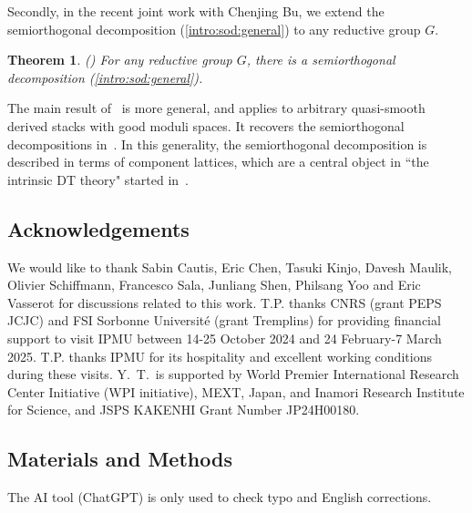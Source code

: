 \documentclass [11pt,oneside,a4paper,mathscr]{amsart}
\newtheorem{thm}{Theorem}[section]
\theoremstyle{definition}
\begin{document}
Secondly, in the recent joint work with Chenjing Bu, we extend the 
semiorthogonal decomposition (\ref{intro:sod:general})
to any reductive group $G$. 
\begin{thm}\emph{(\cite{BPT})}
For any reductive group $G$, there is a semiorthogonal decomposition (\ref{intro:sod:general}). 
\end{thm}
The main result of~\cite{BPT} is more general, and applies to arbitrary 
quasi-smooth derived stacks with good moduli spaces. It recovers the semiorthogonal decompositions in~\cite{PTK3, PThiggs}. 
In this generality, the semiorthogonal decomposition is described 
in terms of component lattices, which are a central object in ``the intrinsic DT theory" started in~\cite{bhik}. 


\subsection{Acknowledgements}
We would like to thank Sabin Cautis, Eric Chen, Tasuki Kinjo, Davesh Maulik, Olivier Schiffmann, Francesco Sala, Junliang Shen, Philsang Yoo and Eric Vasserot for discussions related to this work. 
T.P. thanks CNRS (grant PEPS JCJC) and FSI Sorbonne Université (grant Tremplins) for providing financial support to visit IPMU between 14-25 October 2024 and 24 February-7 March 2025. T.P. thanks IPMU for its hospitality and excellent working conditions during these visits. 
Y.~T.~is supported by World Premier International Research Center
	Initiative (WPI initiative), MEXT, Japan, 
    and Inamori Research Institute for Science, 
    and JSPS KAKENHI Grant Number JP24H00180.

\subsection{Materials and Methods}
The AI tool (ChatGPT) is only used to check typo and English corrections. 
\end{document}
